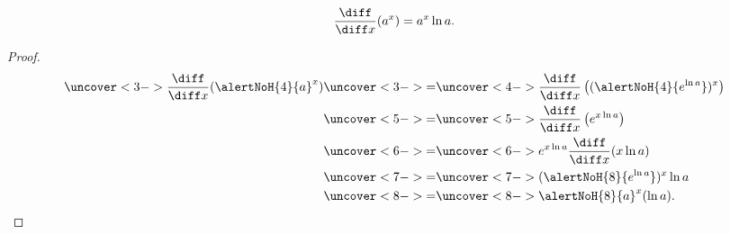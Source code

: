 \begin{frame}
\begin{theorem}
\[
\frac{\diff}{\diff x} (a^x) = a^x \ln a .
\]
\end{theorem}
\begin{proof}
\abovedisplayskip=0pt
\belowdisplayskip=0pt
\abovedisplayshortskip=0pt
\belowdisplayshortskip=0pt
\begin{align*}
\uncover<3->{\frac{\diff}{\diff x} (\alertNoH{ 4}{a}^x)}%
& \uncover<3->{ = }  %
\uncover<4->{\frac{\diff}{\diff x} \left((\alertNoH{ 4}{e^{\ln a}})^x\right) }\\%
& \uncover<5->{ = }  %
\uncover<5->{\frac{\diff}{\diff x}\left( e^{x\ln a}\right)}\\%
& \uncover<6->{ = }  %
\uncover<6->{ e^{x\ln a}\frac{\diff}{\diff x}(x\ln a) }\\%
& \uncover<7->{ = }  %
\uncover<7->{ (\alertNoH{ 8}{e^{\ln a}})^x\ln a }\\%
& \uncover<8->{ = }  %
\uncover<8->{ \alertNoH{ 8}{a}^x(\ln a).}%
\end{align*}
\end{proof}
\end{frame}
